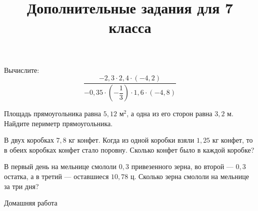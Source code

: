 \begin{class}[number=2]
		\title{Дополнительные задания для 7 класса}
		\begin{listofex}
		\item Вычислите: 
		\[\dfrac{-2,3\cdot2,4\cdot(-4,2)}{-0,35\cdot\left( -\dfrac{1}{3} \right)\cdot1,6\cdot(-4,8)}\]
		\item Площадь прямоугольника равна \( 5,12 \) м\( ^{2} \), а одна из его сторон равна \( 3,2 \) м. Найдите периметр прямоугольника.
		\item В двух коробках \(7,8\) кг конфет. Когда из одной коробки взяли \(1,25\) кг конфет, то в обеих коробках конфет стало поровну. Сколько конфет было в каждой коробке?
		\item В первый день на мельнице смололи \(0,3\) привезенного зерна, во второй --- \(0,3\) остатка, а в третий --- оставшиеся \(10,78\) ц. Сколько зерна смололи на мельнице за три дня?
		\end{listofex}
\end{class}

\begin{homework}[number=2]
	\begin{listofex}
		\item Домашняя работа
	\end{listofex}
\end{homework}

